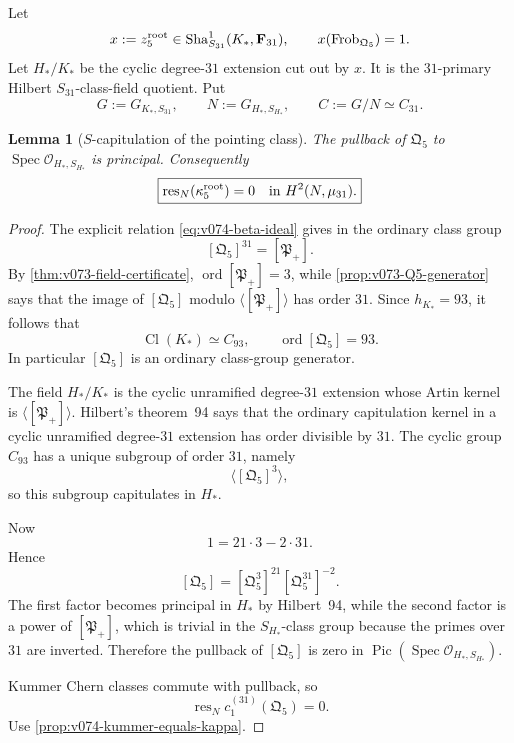 \documentclass[11pt]{article}
\newtheorem{lemma}[theorem]{Lemma}
\theoremstyle{remark}
\providecommand{\Sha}{\operatorname{Sha}}
\begin{document}
Let
\[
 x:=z_5^{\rm root}
 \in
 \Sha^1_{S_{31}}(K_*,\mathbf F_{31}),
 \qquad
 x(\operatorname{Frob}_{\mathfrak Q_5})=1.
\]
Let \(H_*/K_*\) be the cyclic degree-\(31\) extension cut out by \(x\).
It is the \(31\)-primary Hilbert \(S_{31}\)-class-field quotient.  Put
\[
 G:=G_{K_*,S_{31}},
 \qquad
 N:=G_{H_*,S_{H_*}},
 \qquad
 C:=G/N\simeq C_{31}.
\]

\begin{lemma}[\(S\)-capitulation of the pointing class]
\label{lem:v074-S-capitulation}
The pullback of \(\mathfrak Q_5\) to
\(\operatorname{Spec}\mathcal O_{H_*,S_{H_*}}\) is principal.  Consequently
\begin{equation}
 \boxed{
 \operatorname{res}_{N}
 (\kappa_5^{\rm root})
 =0
 \quad\text{in }H^2(N,\mu_{31}).}
 \label{eq:v074-kappa-restriction-zero}
\end{equation}
\end{lemma}

\begin{proof}
The explicit relation
\eqref{eq:v074-beta-ideal} gives in the ordinary class group
\[
 [\mathfrak Q_5]^{31}=[\mathfrak P_+].
\]
By \cref{thm:v073-field-certificate},
\(\operatorname{ord}[\mathfrak P_+]=3\), while
\cref{prop:v073-Q5-generator} says that the image of
\([\mathfrak Q_5]\) modulo \(\langle[\mathfrak P_+]\rangle\) has order
\(31\).  Since \(h_{K_*}=93\), it follows that
\[
 \boxed{
 \operatorname{Cl}(K_*)\simeq C_{93},
 \qquad
 \operatorname{ord}[\mathfrak Q_5]=93.}
\]
In particular \([\mathfrak Q_5]\) is an ordinary class-group generator.

The field \(H_*/K_*\) is the cyclic unramified degree-\(31\) extension
whose Artin kernel is
\(\langle[\mathfrak P_+]\rangle\).
Hilbert's theorem~94 says that the ordinary capitulation kernel in a cyclic
unramified degree-\(31\) extension has order divisible by \(31\).
The cyclic group \(C_{93}\) has a unique subgroup of order \(31\), namely
\[
 \langle[\mathfrak Q_5]^3\rangle,
\]
so this subgroup capitulates in \(H_*\).

Now
\[
 1=21\cdot3-2\cdot31.
\]
Hence
\[
 [\mathfrak Q_5]
 =
 [\mathfrak Q_5^3]^{21}
 [\mathfrak Q_5^{31}]^{-2}.
\]
The first factor becomes principal in \(H_*\) by Hilbert~94, while the
second factor is a power of \([\mathfrak P_+]\), which is trivial in the
\(S_{H_*}\)-class group because the primes over \(31\) are inverted.
Therefore the pullback of \([\mathfrak Q_5]\) is zero in
\(\operatorname{Pic}(\operatorname{Spec}\mathcal O_{H_*,S_{H_*}})\).

Kummer Chern classes commute with pullback, so
\[
 \operatorname{res}_{N}
 c_1^{(31)}(\mathfrak Q_5)=0.
\]
Use \cref{prop:v074-kummer-equals-kappa}.
\end{proof}
\end{document}
